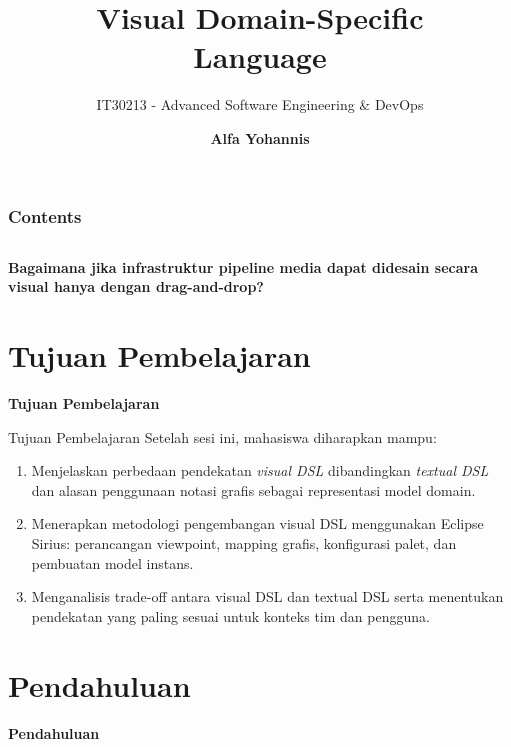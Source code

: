 \documentclass[aspectratio=169, table]{beamer}
\subtitle{IT30213 - Advanced Software Engineering \& DevOps}
\title{\Huge Visual Domain-Specific\vspace{8pt}\\
	Language}
\author{\textbf{Alfa Yohannis}}
\begin{document}
\frame{\titlepage}

\begin{frame}[fragile]
	\frametitle{Contents}
	\vspace{20pt}
	\begin{columns}[t]
		\tableofcontents[sections={1-6}]

		\tableofcontents[sections={7-14}]
	\end{columns}
\end{frame}

\begin{frame}{\hfill}
	\centering
	\Huge{\textbf{Bagaimana jika infrastruktur pipeline media dapat
	didesain secara visual hanya dengan drag-and-drop?}}
\end{frame}

\section{Tujuan Pembelajaran}
\begin{frame}{\hfill}
	\centering
	\Huge{\textbf{Tujuan Pembelajaran}}
\end{frame}

\begin{frame}{Tujuan Pembelajaran}
\vspace{6pt}
Setelah sesi ini, mahasiswa diharapkan mampu:
\begin{enumerate}
  \item Menjelaskan perbedaan pendekatan \textit{visual DSL} dibandingkan \textit{textual DSL} dan alasan penggunaan notasi grafis sebagai representasi model domain.
  \item Menerapkan metodologi pengembangan visual DSL menggunakan Eclipse Sirius: perancangan viewpoint, mapping grafis, konfigurasi palet, dan pembuatan model instans.
  \item Menganalisis trade-off antara visual DSL dan textual DSL serta menentukan pendekatan yang paling sesuai untuk konteks tim dan pengguna.
\end{enumerate}
\end{frame}

\section{Pendahuluan}
\begin{frame}{\hfill}
	\centering
	\Huge{\textbf{Pendahuluan}}
\end{frame}
\end{document}
